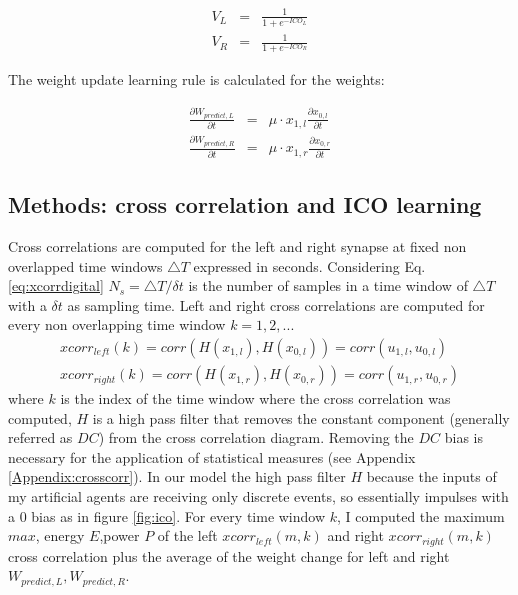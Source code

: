 \begin{eqnarray}
V_{L}&=& \frac{1}{1+e^{-ICO_{L}}}\\
V_{R}&=& \frac{1}{1+e^{-ICO_{R}}}
\end{eqnarray}

The weight update learning rule is calculated for the weights:

\begin{eqnarray}
\frac{\partial W_{predict,L}}{\partial t}&=& \mu \cdot x_{1,l} \frac{\partial x_{0,l}}{\partial t} \label{eq:maxcorr:wleft}\\
\frac{\partial W_{predict,R}}{\partial t}&=& \mu \cdot x_{1,r} \frac{\partial x_{0,r}}{\partial t} \label{eq:maxcorr:wright}
\end{eqnarray}


\subsection{Methods: cross correlation and ICO learning}
Cross correlations are computed for the left and right synapse at fixed non
overlapped time windows $\triangle T$ expressed in seconds.
Considering Eq. \ref{eq:xcorrdigital} $N_{s}=\triangle T/\delta t$ is the number
 of samples in a time window of $\triangle T$ with a $\delta t$ as sampling time.
Left and right cross correlations are computed for every non overlapping time window $k=1,2,...$
\begin{eqnarray}
xcorr_{left}(k)=corr(H(x_{1,l}),H(x_{0,l}))=corr(u_{1,l},u_{0,l})\\
xcorr_{right}(k)=corr(H(x_{1,r}),H(x_{0,r}))=corr(u_{1,r},u_{0,r})
\end{eqnarray}
where $k$ is the index of the time window where the cross correlation was computed,
$H$ is a high pass filter that removes the constant component (generally referred as $DC$)
from the cross correlation diagram. Removing the $DC$ bias is necessary for the application
of statistical measures (see Appendix \ref{Appendix:crosscorr}).
In our model the high pass filter $H$ because the inputs of my artificial agents 
are receiving only discrete events, so essentially impulses with a 0 bias as in figure \ref{fig:ico}.
For every time window $k$, I computed the maximum $max$, energy $E$,power $P$ of the
left $xcorr_{left}(m,k)$ and right $xcorr_{right}(m,k)$ cross correlation plus the average of
the weight change for left and right $W_{predict,L},W_{predict,R}$.
